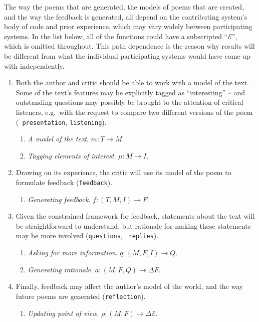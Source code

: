The way the poems that are generated, the models of poems that are
created, and the way the feedback is generated, all depend on the
contributing system's body of code and prior experience, which may
vary widely between participating systems.  In the list below, all of
the functions could have a subscripted ``$\mathcal{E}$'', which is
omitted throughout.  This path dependence is the reason why results
will be different from what the individual participating systems would
have come up with independently.

\begin{enumerate}[label=\Roman*.]
\item Both the author and critic should be able to work with a model
  of the text.  Some of the text's features may be explicitly tagged
  as ``interesting'' -- and outstanding questions may possibly be
  brought to the attention of critical listeners, e.g.~with the
  request to compare two different versions of the poem ({\tt
    presentation}, {\tt listening}).
\begin{enumerate}[label=\arabic*.]
\item \emph{A model of the text}. $m: T\rightarrow M$.
\item \emph{Tagging elements of interest}. $\mu: M\rightarrow I$.
\end{enumerate}
\item Drawing on its experience, the critic will use its model of the
  poem to formulate feedback ({\tt feedback}).
\begin{enumerate}[label=\arabic*.]
\item \emph{Generating feedback}. $f: (T,M,I)\rightarrow F$.
\end{enumerate}
\item Given the constrained framework for feedback, statements about
  the text will be straightforward to understand, but rationale for
  making these statements may be more involved ({\tt questions}, {\tt
    replies}).
\begin{enumerate}[label=\arabic*.]
\item \emph{Asking for more information}. $q: (M,F,I) \rightarrow Q$.
\item \emph{Generating rationale}. $a: (M,F,Q) \rightarrow \Delta F$.
\end{enumerate}
\item Finally, feedback may affect the author's model of the world, and the way future poems are generated ({\tt reflection}).
\begin{enumerate}[label=\arabic*.]
\item \emph{Updating point of view}. $\rho: (M,F) \rightarrow \Delta\mathcal{E}$.
\end{enumerate}
\end{enumerate}

